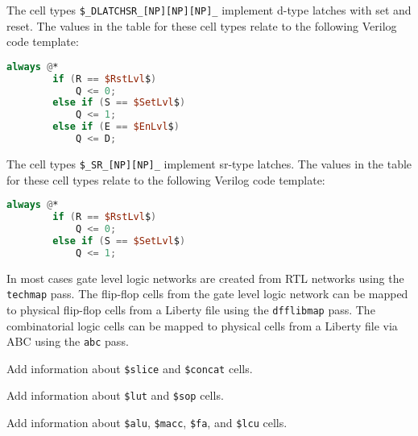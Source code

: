 The cell types {\tt \$\_DLATCHSR\_[NP][NP][NP]\_} implement
d-type latches with set and reset. The values in the table for these cell types relate to the
following Verilog code template:

\begin{lstlisting}[mathescape,language=Verilog]
	always @*
		if (R == $RstLvl$)
			Q <= 0;
		else if (S == $SetLvl$)
			Q <= 1;
		else if (E == $EnLvl$)
			Q <= D;
\end{lstlisting}

The cell types {\tt \$\_SR\_[NP][NP]\_} implement
sr-type latches. The values in the table for these cell types relate to the
following Verilog code template:

\begin{lstlisting}[mathescape,language=Verilog]
	always @*
		if (R == $RstLvl$)
			Q <= 0;
		else if (S == $SetLvl$)
			Q <= 1;
\end{lstlisting}

In most cases gate level logic networks are created from RTL networks using the {\tt techmap} pass. The flip-flop cells
from the gate level logic network can be mapped to physical flip-flop cells from a Liberty file using the {\tt dfflibmap}
pass. The combinatorial logic cells can be mapped to physical cells from a Liberty file via ABC 
using the {\tt abc} pass.

\begin{fixme}
Add information about {\tt \$slice} and {\tt \$concat} cells.
\end{fixme}

\begin{fixme}
Add information about {\tt \$lut} and {\tt \$sop} cells.
\end{fixme}

\begin{fixme}
Add information about {\tt \$alu}, {\tt \$macc}, {\tt \$fa}, and {\tt \$lcu} cells.
\end{fixme}
